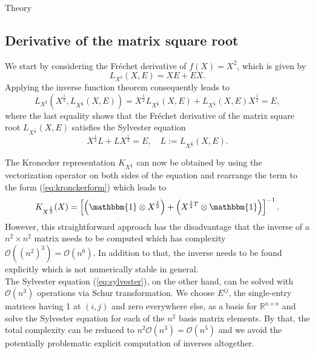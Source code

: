 \begin{chapter}{Theory}
\subsection{Derivative of the matrix square root} %
\label{sub:Derivative of the matrix square root}
We start by considering the Fr\'{e}chet derivative of $f(X)=X^2$, which is given by
\begin{equation}
    L_{X^2}(X,E) = XE + EX.
\end{equation}
Applying the inverse function theorem consequently leads to
\begin{equation}
    L_{X^2}(X^{\frac{1}{2}},L_{X^{\frac{1}{2}}}(X,E))=X^{\frac{1}{2}}L_{X^{\frac{1}{2}}}(X,E) + L_{X^{\frac{1}{2}}}(X,E)X^{\frac{1}{2}} = E,
\end{equation}
where the last equality shows that the Fr\'{e}chet derivative of the matrix square root $L_{X^{\frac{1}{2}}}(X,E)$ satisfies the Sylvester equation 
\begin{equation}
    \label{eq:sylvester}
    X^{\frac{1}{2}}L + LX^{\frac{1}{2}} = E,\quad L:=L_{X^{\frac{1}{2}}}(X,E).
\end{equation}

The Kronecker representation $K_{X^{\frac{1}{2}}}$ can now be obtained by using the vectorization operator on both sides of the equation and rearrange the term
to the form (\ref{eq:kronckerform}) which leads to
\begin{equation}
    K_{X^{\frac{1}{2}}}(X)=\left[\left(\mathbbm{1}\otimes X^{\frac{1}{2}}\right)+\left(X^{\frac{1}{2}T}\otimes \mathbbm{1}\right) \right]^{-1}.
\end{equation}
However, this straightforward approach has the disadvantage that the inverse of a $n^2\times n^2$ matrix needs to be computed which has complexity
$\mathcal{O}((n^2)^3)=\mathcal{O}(n^6)$. In addition to that, the inverse needs to be found explicitly which is not numerically stable in general.\\

The Sylvester equation (\ref{eq:sylvester}), on the other hand, can be solved with $\mathcal{O}(n^3)$ operations via Schur transformation. We choose $E^{ij}$, the single-entry
matrices having 1 at $(i,j)$ and zero everywhere else, as a basis for $\mathbb{R}^{n\times n}$ and solve the Sylvester equation for each of the $n^2$ 
basis matrix elements. By that, the total complexity can be reduced to $n^2\mathcal{O}(n^3)=\mathcal{O}(n^5)$ and we avoid the 
potentially problematic explicit computation of inverses altogether.\\


\end{chapter}
